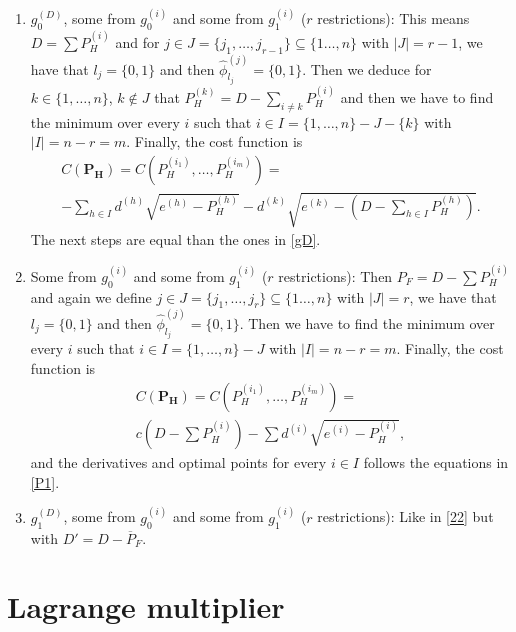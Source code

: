 \documentclass[12pt]{article}
\theoremstyle{definition}
\theoremstyle{remark}
\begin{document}
\begin{enumerate}

\item $g^{(D)}_0$, some from $g_0^{(i)}$ and some from $g_1^{(i)}$ ($r$ restrictions): This means $D=\sum P_H^{(i)}$ and for $j\in J=\{j_1,\dots,j_{r-1}\}\subseteq\{1\dots,n\}$ with $|J|=r-1$, we have that $l_j=\{0,1\}$ and then $\hat{\phi}_{l_j}^{(j)}=\{0,1\}$. Then we deduce for $k\in\{1,\dots,n\}$, $k\notin J$ that $P_H^{(k)}=D-\sum_{i\neq k}P_H^{(i)}$ and then we have to find the minimum over every $i$ such that $i\in I=\{1,\dots,n\}-J-\{k\}$ with $|I|=n-r=m$. Finally, the cost function is
\begin{multline*}
C(\bm{P_H})=C\left(P_H^{(i_1)},\dots,P_H^{(i_m)}\right)=\\
-\sum_{h\in I}d^{(h)}\sqrt{e^{(h)}-P_H^{(h)}}-d^{(k)}\sqrt{e^{(k)}-\left(D-\sum_{h\in I}P_H^{(h)}\right)}.
\end{multline*}
The next steps are equal than the ones in \ref{gD}.

\item Some from $g_0^{(i)}$ and some from $g_1^{(i)}$ ($r$ restrictions): Then $P_F=D-\sum P_H^{(i)}$ and again we define $j\in J=\{j_1,\dots,j_r\}\subseteq\{1\dots,n\}$ with $|J|=r$, we have that $l_j=\{0,1\}$ and then $\hat{\phi}_{l_j}^{(j)}=\{0,1\}$. Then we have to find the minimum over every $i$ such that $i\in I=\{1,\dots,n\}-J$ with $|I|=n-r=m$. Finally, the cost function is
\begin{multline*}
C(\bm{P_H})=C\left(P_H^{(i_1)},\dots,P_H^{(i_m)}\right)=\\
c(D-\sum P_H^{(i)})-\sum d^{(i)}\sqrt{e^{(i)}-P_H^{(i)}},
\end{multline*}
and the derivatives and optimal points for every $i\in I$ follows the equations in \ref{P1}.
\label{22}

\item $g^{(D)}_1$, some from $g_0^{(i)}$ and some from $g_1^{(i)}$ ($r$ restrictions): Like in \ref{22} but with $D'=D-\overline{P}_F$.

\end{enumerate}

\section{Lagrange multiplier}
\end{document}
